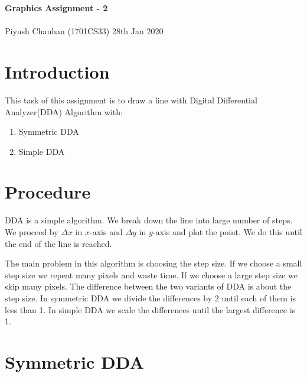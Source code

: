 \documentclass[a4paper, 11pt]{article}
\begin{document}
	\noindent
	{\Huge\textbf{Graphics Assignment - 2}} \\ \\
	\Large Piyush Chauhan (1701CS33)  \hfill 28th Jan 2020\\ 

	
	\section*{Introduction}
	This task of this assignment is to draw a line with Digital Differential Analyzer(DDA) Algorithm with:
	\begin{enumerate}
		\item Symmetric DDA
		\item Simple DDA
	\end{enumerate}


	\section*{Procedure}
	
DDA is a simple algorithm. We break down the line into large number of steps. We proceed by $\Delta x$ in $x$-axis and $\Delta y$ in $y$-axis and plot the point. We do this until the end of the line is reached.

The main problem in this algorithm is choosing the step size. If we choose a small step size we repeat many pixels and waste time. If we choose a large step size we skip many pixels. The difference between the two variants of DDA is about the step size. In symmetric DDA we divide the differences by 2 until each of them is less than 1. In simple DDA we scale the differences until the largest difference is 1.

\section*{Symmetric DDA}
\end{document}
